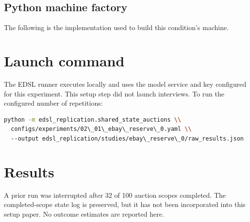 \documentclass[11pt]{article}
\begin{document}
\subsection{Python machine factory}
The following is the implementation used to build this condition's machine.


\section{Launch command}
The EDSL runner executes locally and uses the model service and key configured
for this experiment. This setup step did not launch interviews. To run the
configured number of repetitions:
\begin{lstlisting}[language=bash]
python -m edsl_replication.shared_state_auctions \\
  configs/experiments/02\_01\_ebay\_reserve\_0.yaml \\
  --output edsl_replication/studies/ebay\_reserve\_0/raw_results.json
\end{lstlisting}
\section{Results}
A prior run was interrupted after 32 of 100 auction scopes completed. The completed-scope state log is preserved, but it has not been incorporated into this setup paper. No outcome estimates are reported here.
\end{document}
